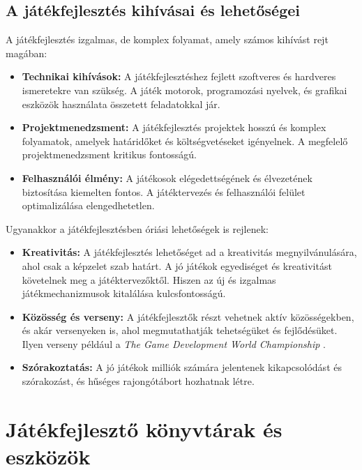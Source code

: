 \subsection{A játékfejlesztés kihívásai és lehetőségei}
\indent \indent A játékfejlesztés izgalmas, de komplex folyamat, amely számos kihívást rejt magában:
\begin{itemize}
    \item \textbf{Technikai kihívások:} A játékfejlesztéshez fejlett szoftveres és hardveres ismeretekre van szükség. A játék motorok, programozási nyelvek, és grafikai eszközök használata összetett feladatokkal jár.

    
    \item \textbf{Projektmenedzsment:} A játékfejlesztés projektek hosszú és komplex folyamatok, amelyek határidőket és költségvetéseket igényelnek. A megfelelő projektmenedzsment kritikus fontosságú.
    
    \item \textbf{Felhasználói élmény:} A játékosok elégedettségének és élvezetének biztosítása kiemelten fontos. A játéktervezés és felhasználói felület optimalizálása elengedhetetlen.
    
\end{itemize}

Ugyanakkor a játékfejlesztésben óriási lehetőségek is rejlenek:

\begin{itemize}

    \item \textbf{Kreativitás:} A játékfejlesztés lehetőséget ad a kreativitás megnyilvánulására, ahol csak a képzelet szab határt. A jó játékok egyediséget és kreativitást követelnek meg a játéktervezőktől. Hiszen az új és izgalmas játékmechanizmusok kitalálása kulcsfontosságú.
    
    \item \textbf{Közösség és verseny:} A játékfejlesztők részt vehetnek aktív közösségekben, és akár versenyeken is, ahol megmutathatják tehetségüket és fejlődésüket. Ilyen verseny például a \textsl{The Game Development World Championship} \cite{tgdwc}.

    \item \textbf{Szórakoztatás:} A jó játékok milliók számára jelentenek kikapcsolódást és szórakozást, és hűséges rajongótábort hozhatnak létre.
\end{itemize}
\section{Játékfejlesztő könyvtárak és eszközök}

